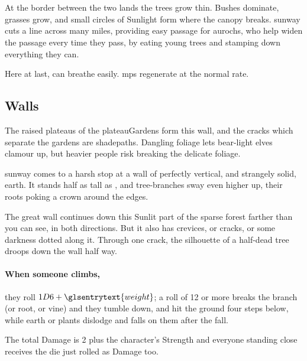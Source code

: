 \section{}
\label{sunway}

At the border between the two lands the trees grow thin.
Bushes dominate, grasses grow, and small circles of Sunlight form where the canopy breaks.
\Gls{sunway} cuts a line across many miles, providing easy passage for aurochs, who help widen the passage every time they pass, by eating young trees and stamping down everything they can.

Here at last,  can breathe easily.
\Glspl{mp} regenerate at the normal rate.


\begin{multicols}{2}
\subsection{ Walls}

The raised plateaus of the \gls{plateauGardens} form this wall, and the cracks which separate the gardens are \gls{shadepaths}.
Dangling foliage lets bear-light elves clamour up, but heavier people risk breaking the delicate foliage.

\begin{boxtext}
  \Gls{sunway} comes to a harsh stop at a wall of perfectly vertical, and strangely solid, earth.
  It stands half as tall as , and tree-branches sway even higher up, their roots poking a crown around the edges.

  The great wall continues down this Sunlit part of the sparse forest farther than you can see, in both directions.
  But it also has crevices, or cracks, or some darkness dotted along it.
  Through one crack, the silhouette of a half-dead tree droops down the wall half way.
\end{boxtext}

\paragraph{When someone climbs,}
they roll $1D6 + \glsentrytext{weight}$; a roll of 12 or more breaks the branch (or root, or vine) and they tumble down, and hit the ground four \glspl{step} below, while earth or plants dislodge and falls on them after the fall.

The total Damage is 2 plus the character's Strength%
and everyone standing close receives the die just rolled as Damage too.


\end{multicols}
